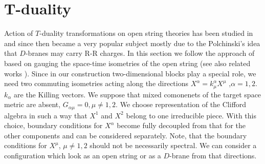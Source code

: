\documentclass[a4paper,12pt,twoside]{article}
\begin{document}
\section{T-duality}
Action of $T$-duality transformations on open string theories
has been studied in 
\cite{Dai:1989ua,Leigh:1989jq,Horava:1989ga,Green:1991et}
and since then became a very popular
subject mostly due to the Polchinski's idea \cite{Polchinski:1995mt}  
that $D$-branes may carry R-R charges.
In this section we follow the approach of \cite{Alvarez:1996up}
based on gauging the space-time isometries of the open
string (see also related works \cite{Dorn:1996an,Forste:1996hy}).
Since in our construction two-dimensional blocks play a special
role, we need two commuting isometries acting along the directions
$X^\alpha =k^\alpha_\mu X^\mu$ ,$\alpha =1,2$. 
$k_\alpha$ are the Killing vectors. We suppose that mixed comonenets
of the target space metric are absent, $G_{\alpha \mu}=0, \mu \ne 1,2$.
We choose representation of the Clifford
algebra in such a way that $X^1$ and $X^2$ belong to one irreducible
piece. With this choice, boundary conditions for $X^\alpha$
become fully decoupled from that for the other components
and can be considered separately. Note, that the boundary conditions
for $X^\mu$, $\mu \ne 1,2$ should not be necessarily spectral.
We can consider a configuration which look as an open
string or as a $D$-brane from that directions.
 
\end{document}
